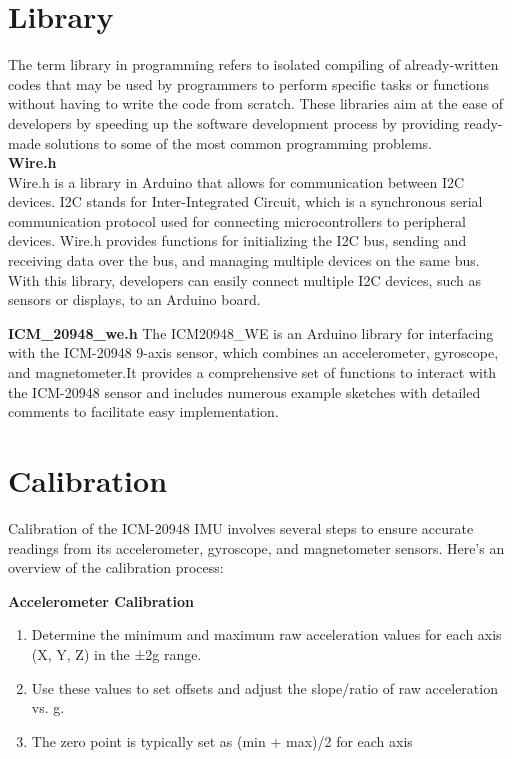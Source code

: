 \newpage
\section{Library}

The term library in programming refers to isolated compiling of already-written codes that may be used by programmers to perform specific tasks or functions without having to write the code from scratch.
These libraries aim at the ease of developers by speeding up the software development process by providing ready-made solutions to some of the most common programming problems. \\

\textbf{Wire.h}\\
Wire.h is a library in Arduino that allows for communication between I2C devices.
I2C stands for Inter-Integrated Circuit, which is a synchronous serial communication
protocol used for connecting microcontrollers to peripheral devices. Wire.h provides
functions for initializing the I2C bus, sending and receiving data over the bus, and
managing multiple devices on the same bus. With this library, developers can easily
connect multiple I2C devices, such as sensors or displays, to an Arduino board.\cite{arduinoWire:2025}

\medskip

\textbf{ICM\_20948\_we.h}
The ICM20948\_WE is an Arduino library for interfacing with the ICM-20948 9-axis sensor, which combines an accelerometer, gyroscope, and magnetometer.It provides a comprehensive set of functions to interact with the ICM-20948 sensor and includes numerous example sketches with detailed comments to facilitate easy implementation.\cite{Ewald:2021}


\section{Calibration}

Calibration of the ICM-20948 IMU involves several steps to ensure accurate readings from its accelerometer, gyroscope, and magnetometer sensors. Here's an overview of the calibration process:

\textbf{Accelerometer Calibration}
\begin{enumerate}
	\item Determine the minimum and maximum raw acceleration values for each axis (X, Y, Z) in the ±2g range.
	
	\item Use these values to set offsets and adjust the slope/ratio of raw acceleration vs. g.\cite{Ewald:2021}
	
	\item The zero point is typically set as (min + max)/2 for each axis
\end{enumerate}

